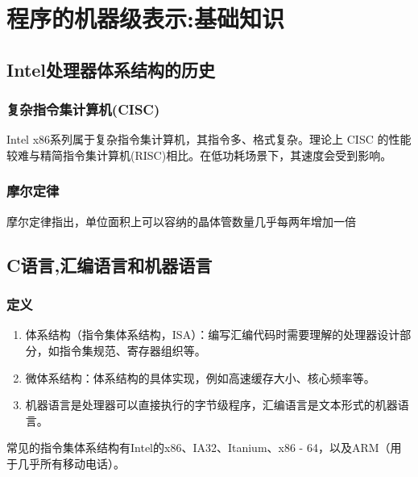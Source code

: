\section{程序的机器级表示:基础知识}
\subsection{Intel处理器体系结构的历史}

\subsubsection{复杂指令集计算机(CISC)}
Intel x86系列属于复杂指令集计算机，其指令多、格式复杂。理论上 CISC 的性能较难与精简指令集计算机(RISC)相比。在低功耗场景下，其速度会受到影响。


\subsubsection{摩尔定律}
摩尔定律指出，单位面积上可以容纳的晶体管数量几乎每两年增加一倍


\subsection{C语言,汇编语言和机器语言}
\subsubsection{定义}
\begin{enumerate}
    \item 体系结构（指令集体系结构，ISA）：编写汇编代码时需要理解的处理器设计部分，如指令集规范、寄存器组织等。
    \item 微体系结构：体系结构的具体实现，例如高速缓存大小、核心频率等。
    \item 机器语言是处理器可以直接执行的字节级程序，汇编语言是文本形式的机器语言。
\end{enumerate}
常见的指令集体系结构有Intel的x86、IA32、Itanium、x86 - 64，以及ARM（用于几乎所有移动电话）。

